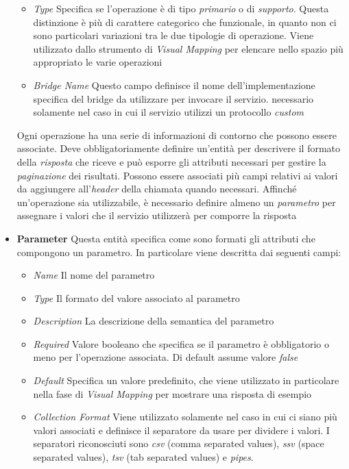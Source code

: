 \begin{itemize}
\begin{itemize}
		\item \emph{Type} Specifica se l'operazione è di tipo \emph{primario} o di \emph{supporto}. Questa distinzione è più di carattere categorico che funzionale, in quanto non ci sono particolari variazioni tra le due tipologie di operazione. Viene utilizzato dallo strumento di \emph{Visual Mapping} per elencare nello spazio più appropriato le varie operazioni
		\item \emph{Bridge Name} Questo campo definisce il nome dell'implementazione specifica del bridge da utilizzare per invocare il servizio. \upe necessario solamente nel caso in cui il servizio utilizzi un protocollo \emph{custom}
	\end{itemize}
	Ogni operazione ha una serie di informazioni di contorno che possono essere associate. Deve obbligatoriamente definire un'entità per descrivere il formato della \emph{risposta} che riceve e può esporre gli attributi necessari per gestire la \emph{paginazione} dei risultati. Possono essere associati più campi relativi ai valori da aggiungere all'\emph{header} della chiamata quando necessari. Affinché un'operazione sia utilizzabile, è necessario definire almeno un \emph{parametro} per assegnare i valori che il servizio utilizzerà per comporre la risposta
	\item \textbf{Parameter} Questa entità specifica come sono formati gli attributi che compongono un parametro. In particolare viene descritta dai seguenti campi:
	\begin{itemize}
		\item \emph{Name} Il nome del parametro
		\item \emph{Type} Il formato del valore associato al parametro
		\item \emph{Description} La descrizione della semantica del parametro
		\item \emph{Required} Valore booleano che specifica se il parametro è obbligatorio o meno per l'operazione associata. Di default assume valore \emph{false}
		\item \emph{Default} Specifica un valore predefinito, che viene utilizzato in particolare nella fase di \emph{Visual Mapping} per mostrare una risposta di esempio
		\item \emph{Collection Format} Viene utilizzato solamente nel caso in cui ci siano più valori associati e definisce il separatore da usare per dividere i valori. I separatori riconosciuti sono \emph{csv} (comma separated values), \emph{ssv} (space separated values), \emph{tsv} (tab separated values) e \emph{pipes}.

\end{itemize}
\end{itemize}
